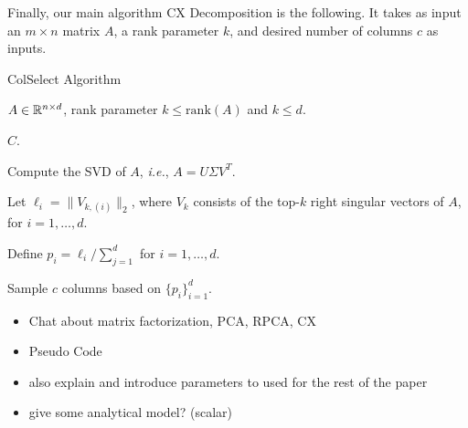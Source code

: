 Finally, our main algorithm {\sc CX Decomposition} is the following.  It takes as input an $m \times n$ matrix $A$, a rank parameter $k$, and desired number of columns $c$ as inputs.

 \begin{algorithm}[tb]
 \caption{{\sc ColSelect} Algorithm}
  \label{alg:cs}
  \begin{algorithmic}[1]
    \Require $A \in \mathbb{R}^{n\times d}$, rank parameter $k \leq \textrm{rank}(A)$ and $k\leq d$.

    \Ensure $C$.
    

    \State Compute the SVD of $A$, \emph{i.e.}, $A = U \Sigma V^T$.

    \State Let $\ell_i = \| V_{k,(i)}\|_2$, where $V_k$ consists of the top-$k$ right singular vectors of $A$, for $i = 1, \ldots, d$. 
    
    \State Define $p_i = \ell_i / \sum_{j=1}^d$ for $i=1,\ldots,d$.
    
    \State Sample $c$ columns based on $\{p_i\}_{i=1}^d$.

    

    \end{algorithmic}
\end{algorithm}


\begin{itemize}

  \item Chat about matrix factorization, PCA, RPCA, CX 

  \item Pseudo Code

  \item also explain and introduce parameters to used for the rest of the paper

  \item give some analytical model? (scalar)

\end{itemize}

